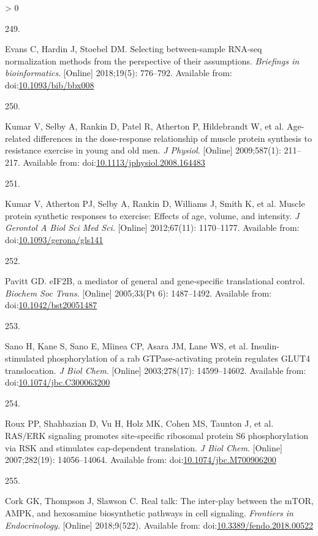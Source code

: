 \documentclass[twoside,10pt]{gihclass} %
\newlength{\cslhangindent}
\newlength{\csllabelwidth}
\newenvironment{CSLReferences}[3] %
 {%
  \setlength{\parindent}{0pt}
  \ifodd #1 \everypar{\setlength{\hangindent}{\cslhangindent}}\ignorespaces\fi
  \ifnum #2 > 0
  \setlength{\parskip}{#2\baselineskip}
  \fi
 }%
 {}
\newcommand{\CSLLeftMargin}[1]{\parbox[t]{\maxof{\widthof{#1}}{\csllabelwidth}}{#1}}
\newcommand{\CSLRightInline}[1]{\parbox[t]{\linewidth}{#1}}
\begin{document}
\begin{CSLReferences}{0}{0}
\leavevmode\hypertarget{ref-RN2878}{}%
\CSLLeftMargin{249. }
\CSLRightInline{Evans C, Hardin J, Stoebel DM. Selecting between-sample RNA-seq normalization methods from the perspective of their assumptions. \emph{Briefings in bioinformatics}. {[}Online{]} 2018;19(5): 776--792. Available from: doi:\href{https://doi.org/10.1093/bib/bbx008}{10.1093/bib/bbx008}}

\leavevmode\hypertarget{ref-RN2720}{}%
\CSLLeftMargin{250. }
\CSLRightInline{Kumar V, Selby A, Rankin D, Patel R, Atherton P, Hildebrandt W, et al. Age-related differences in the dose-response relationship of muscle protein synthesis to resistance exercise in young and old men. \emph{J Physiol}. {[}Online{]} 2009;587(1): 211--217. Available from: doi:\href{https://doi.org/10.1113/jphysiol.2008.164483}{10.1113/jphysiol.2008.164483}}

\leavevmode\hypertarget{ref-RN2716}{}%
\CSLLeftMargin{251. }
\CSLRightInline{Kumar V, Atherton PJ, Selby A, Rankin D, Williams J, Smith K, et al. Muscle protein synthetic responses to exercise: Effects of age, volume, and intensity. \emph{J Gerontol A Biol Sci Med Sci}. {[}Online{]} 2012;67(11): 1170--1177. Available from: doi:\href{https://doi.org/10.1093/gerona/gls141}{10.1093/gerona/gls141}}

\leavevmode\hypertarget{ref-RN2853}{}%
\CSLLeftMargin{252. }
\CSLRightInline{Pavitt GD. eIF2B, a mediator of general and gene-specific translational control. \emph{Biochem Soc Trans}. {[}Online{]} 2005;33(Pt 6): 1487--1492. Available from: doi:\href{https://doi.org/10.1042/bst20051487}{10.1042/bst20051487}}

\leavevmode\hypertarget{ref-RN2856}{}%
\CSLLeftMargin{253. }
\CSLRightInline{Sano H, Kane S, Sano E, Mîinea CP, Asara JM, Lane WS, et al. Insulin-stimulated phosphorylation of a rab GTPase-activating protein regulates GLUT4 translocation. \emph{J Biol Chem}. {[}Online{]} 2003;278(17): 14599--14602. Available from: doi:\href{https://doi.org/10.1074/jbc.C300063200}{10.1074/jbc.C300063200}}

\leavevmode\hypertarget{ref-RN2311}{}%
\CSLLeftMargin{254. }
\CSLRightInline{Roux PP, Shahbazian D, Vu H, Holz MK, Cohen MS, Taunton J, et al. RAS/ERK signaling promotes site-specific ribosomal protein S6 phosphorylation via RSK and stimulates cap-dependent translation. \emph{J Biol Chem}. {[}Online{]} 2007;282(19): 14056--14064. Available from: doi:\href{https://doi.org/10.1074/jbc.M700906200}{10.1074/jbc.M700906200}}

\leavevmode\hypertarget{ref-RN2858}{}%
\CSLLeftMargin{255. }
\CSLRightInline{Cork GK, Thompson J, Slawson C. Real talk: The inter-play between the mTOR, AMPK, and hexosamine biosynthetic pathways in cell signaling. \emph{Frontiers in Endocrinology}. {[}Online{]} 2018;9(522). Available from: doi:\href{https://doi.org/10.3389/fendo.2018.00522}{10.3389/fendo.2018.00522}}


\end{CSLReferences}
\end{document}
